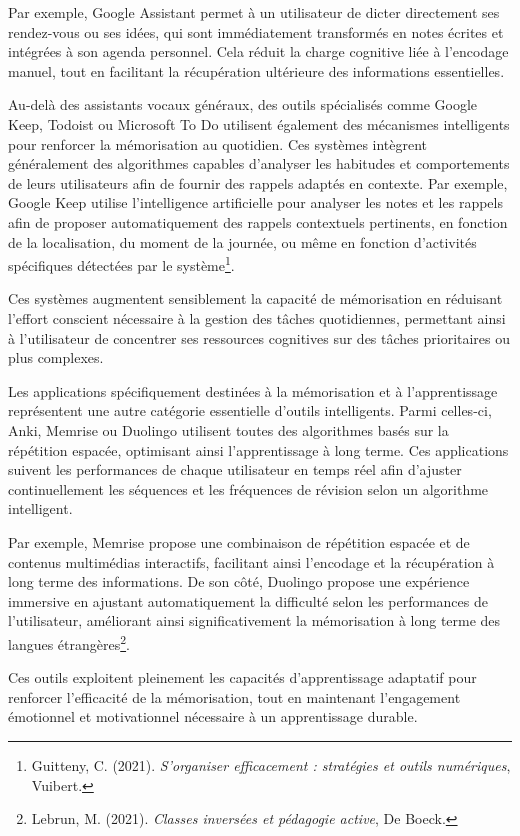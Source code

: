 \documentclass[11pt,a4paper]{report}
\begin{document}
Par exemple, Google Assistant permet à un utilisateur de dicter directement ses rendez-vous ou ses idées, qui sont immédiatement transformés en notes écrites et intégrées à son agenda personnel. Cela réduit la charge cognitive liée à l’encodage manuel, tout en facilitant la récupération ultérieure des informations essentielles.

Au-delà des assistants vocaux généraux, des outils spécialisés comme Google Keep, Todoist ou Microsoft To Do utilisent également des mécanismes intelligents pour renforcer la mémorisation au quotidien. Ces systèmes intègrent généralement des algorithmes capables d’analyser les habitudes et comportements de leurs utilisateurs afin de fournir des rappels adaptés en contexte. Par exemple, Google Keep utilise l’intelligence artificielle pour analyser les notes et les rappels afin de proposer automatiquement des rappels contextuels pertinents, en fonction de la localisation, du moment de la journée, ou même en fonction d'activités spécifiques détectées par le système\footnote{Guitteny, C. (2021). \textit{S'organiser efficacement : stratégies et outils numériques}, Vuibert.}.

Ces systèmes augmentent sensiblement la capacité de mémorisation en réduisant l’effort conscient nécessaire à la gestion des tâches quotidiennes, permettant ainsi à l’utilisateur de concentrer ses ressources cognitives sur des tâches prioritaires ou plus complexes.

Les applications spécifiquement destinées à la mémorisation et à l’apprentissage représentent une autre catégorie essentielle d’outils intelligents. Parmi celles-ci, Anki, Memrise ou Duolingo utilisent toutes des algorithmes basés sur la répétition espacée, optimisant ainsi l'apprentissage à long terme. Ces applications suivent les performances de chaque utilisateur en temps réel afin d’ajuster continuellement les séquences et les fréquences de révision selon un algorithme intelligent.

Par exemple, Memrise propose une combinaison de répétition espacée et de contenus multimédias interactifs, facilitant ainsi l’encodage et la récupération à long terme des informations. De son côté, Duolingo propose une expérience immersive en ajustant automatiquement la difficulté selon les performances de l’utilisateur, améliorant ainsi significativement la mémorisation à long terme des langues étrangères\footnote{Lebrun, M. (2021). \textit{Classes inversées et pédagogie active}, De Boeck.}.

Ces outils exploitent pleinement les capacités d’apprentissage adaptatif pour renforcer l'efficacité de la mémorisation, tout en maintenant l’engagement émotionnel et motivationnel nécessaire à un apprentissage durable.
\end{document}
